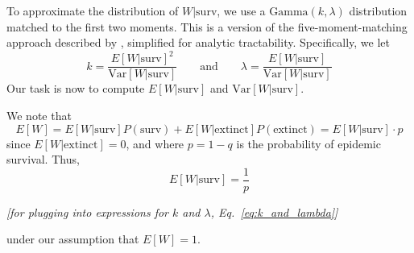 To approximate the distribution of $W|\text{surv}$, we use a $\text{Gamma}(k, \lambda)$ distribution matched to the first two moments. This is a version of the five-moment-matching approach described by \cite{morris_computation_2024}, simplified for analytic tractability. Specifically, we let  
\begin{equation}
	k = \frac{E[W|\text{surv}]^2}{\text{Var}[W|\text{surv}]} \qquad \text{and} \qquad \lambda = \frac{E[W|\text{surv}]}{\text{Var}[W|\text{surv}]}
	\label{eq:k_and_lambda}
\end{equation}
Our task is now to compute $E[W|\text{surv}]$ and $\text{Var}[W|\text{surv}]$. 

 We note that 
\begin{equation}
E[W] = E[W|\text{surv}] P(\text{surv}) + E[W|\text{extinct}] P(\text{extinct}) = E[W | \text{surv}] \cdot p
\label{eq:p_explanation}
\end{equation}
since $E[W|\text{extinct}] = 0$, and where $p = 1-q$ is the probability of epidemic survival. Thus,
\begin{equation}
\boxed{E[W|\text{surv}] = \frac{1}{p}}
\end{equation}
\begin{center}
{\it [for plugging into expressions for $k$ and $\lambda$, Eq.~\ref{eq:k_and_lambda}]} \\ 
\end{center} 
under our assumption that $E[W] = 1$. 

